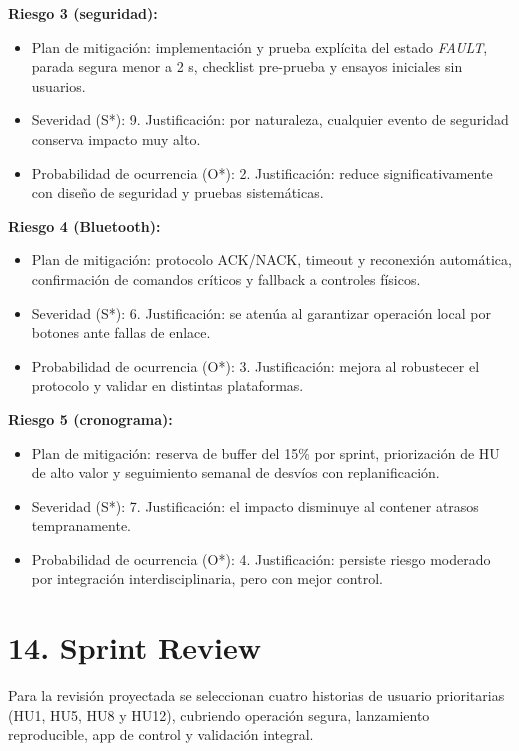 ﻿\documentclass[
11pt, %
]{charter}
\begin{document}
\textbf{Riesgo 3 (seguridad):}
\begin{itemize}
	\item Plan de mitigación: implementación y prueba explícita del estado \textit{FAULT}, parada segura menor a 2 s, checklist pre-prueba y ensayos iniciales sin usuarios.
	\item Severidad (S*): 9. Justificación: por naturaleza, cualquier evento de seguridad conserva impacto muy alto.
	\item Probabilidad de ocurrencia (O*): 2. Justificación: reduce significativamente con diseño de seguridad y pruebas sistemáticas.
\end{itemize}

\textbf{Riesgo 4 (Bluetooth):}
\begin{itemize}
	\item Plan de mitigación: protocolo ACK/NACK, timeout y reconexión automática, confirmación de comandos críticos y fallback a controles físicos.
	\item Severidad (S*): 6. Justificación: se atenúa al garantizar operación local por botones ante fallas de enlace.
	\item Probabilidad de ocurrencia (O*): 3. Justificación: mejora al robustecer el protocolo y validar en distintas plataformas.
\end{itemize}

\textbf{Riesgo 5 (cronograma):}
\begin{itemize}
	\item Plan de mitigación: reserva de buffer del 15\% por sprint, priorización de HU de alto valor y seguimiento semanal de desvíos con replanificación.
	\item Severidad (S*): 7. Justificación: el impacto disminuye al contener atrasos tempranamente.
	\item Probabilidad de ocurrencia (O*): 4. Justificación: persiste riesgo moderado por integración interdisciplinaria, pero con mejor control.
\end{itemize}

\newpage
\section{14. Sprint Review}
\label{sec:sprint_review}


Para la revisión proyectada se seleccionan cuatro historias de usuario prioritarias (HU1, HU5, HU8 y HU12), cubriendo operación segura, lanzamiento reproducible, app de control y validación integral.
\end{document}
